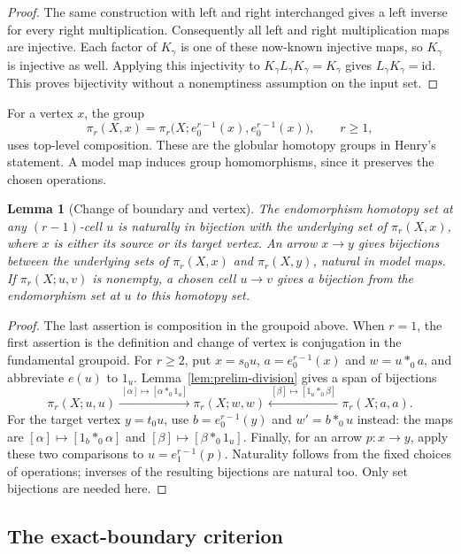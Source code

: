 \documentclass[11pt,letterpaper]{article}
\numberwithin{equation}{section}
\theoremstyle{plain}
\newtheorem{lemma}[theorem]{Lemma}
\theoremstyle{definition}
\theoremstyle{remark}
\begin{document}
\begin{proof}
The same construction with left and right interchanged gives a
left inverse for every right multiplication.  Consequently all
left and right multiplication maps are injective.  Each factor
of $K_\gamma$ is one of these now-known injective maps, so
$K_\gamma$ is injective as well.  Applying this injectivity to
$K_\gamma L_\gamma K_\gamma=K_\gamma$ gives
$L_\gamma K_\gamma=\mathrm{id}$.  This proves bijectivity without a
nonemptiness assumption on the input set.
\end{proof}

For a vertex $x$, the group
\[
 \pi_r(X,x)=
 \pi_r\bigl(X;e_0^{r-1}(x),e_0^{r-1}(x)\bigr),\qquad r\ge1,
\]
uses top-level composition.  These are the globular homotopy groups
in Henry's statement.  A model map induces group homomorphisms,
since it preserves the chosen operations.

\begin{lemma}[Change of boundary and vertex]\label{lem:prelim-boundary-change}
The endomorphism homotopy set at any $(r-1)$-cell $u$ is naturally
in bijection with the underlying set of $\pi_r(X,x)$, where $x$
is either its source or its target vertex.  An arrow $x\to y$
gives bijections between the underlying sets of $\pi_r(X,x)$
and $\pi_r(X,y)$, natural in model maps.  If
$\pi_r(X;u,v)$ is nonempty, a chosen cell $u\to v$ gives a
bijection from the endomorphism set at $u$ to this homotopy set.
\end{lemma}

\begin{proof}
The last assertion is composition in the groupoid above.  When
$r=1$, the first assertion is the definition and change of
vertex is conjugation in the fundamental groupoid.  For $r\ge2$,
put $x=s_0u$, $a=e_0^{r-1}(x)$ and $w=u*_0a$, and abbreviate
$e(u)$ to $1_u$.  Lemma~\ref{lem:prelim-division} gives a span
of bijections
\[
 \pi_r(X;u,u)
 \xrightarrow{\ [\alpha]\mapsto[\alpha*_0 1_a]\ }
 \pi_r(X;w,w)
 \xleftarrow{\ [\beta]\mapsto[1_u*_0\beta]\ }
 \pi_r(X;a,a).
\]
For the target vertex $y=t_0u$, use
$b=e_0^{r-1}(y)$ and $w'=b*_0u$ instead: the maps are
$[\alpha]\mapsto[1_b*_0\alpha]$ and
$[\beta]\mapsto[\beta*_0 1_u]$.  Finally, for an arrow
$p:x\to y$, apply these two comparisons to
$u=e_1^{r-1}(p)$.  Naturality follows from the fixed choices of
operations; inverses of the resulting bijections are natural too.
Only set bijections are needed here.
\end{proof}

\subsection{The exact-boundary criterion}
\end{document}
